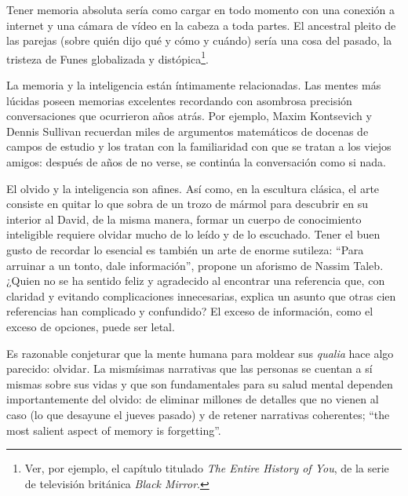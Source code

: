 \documentclass[12pt,a4paper, spanish]{amsart}
\numberwithin{equation}{section}
\theoremstyle{plain}
\theoremstyle{definition}
\begin{document}
Tener memoria absoluta sería como cargar en todo momento con una conexión a internet y una cámara de vídeo en la cabeza a toda partes. El ancestral pleito de las parejas (sobre quién dijo qué y cómo y cuándo) sería una cosa del pasado,  la tristeza de Funes globalizada y distópica\footnote{Ver, por ejemplo, el capítulo titulado \emph{The Entire History of You}, de la serie de televisión británica \emph{Black Mirror}.}. 

La memoria y la inteligencia están íntimamente relacionadas. Las mentes más lúcidas poseen memorias excelentes recordando con asombrosa precisión conversaciones que ocurrieron años atrás. Por ejemplo, Maxim Kontsevich y Dennis Sullivan recuerdan miles de argumentos matemáticos de docenas de campos de estudio y los tratan con la familiaridad con que se tratan a los viejos amigos: después de años de no verse, se continúa la conversación como si nada.

El olvido y la inteligencia son afines. Así como, en la escultura clásica, el arte consiste en quitar lo que sobra de un trozo de mármol para descubrir en su interior al David, de la misma manera, formar un cuerpo de conocimiento inteligible requiere olvidar mucho de lo leído y de lo escuchado. Tener el buen gusto de recordar lo esencial es también un arte de enorme sutileza: ``Para arruinar a un tonto, dale información'', propone un aforismo de Nassim Taleb\autocite{TalebAforismos}. ¿Quien no se ha sentido feliz y agradecido al encontrar una referencia que, con claridad y evitando complicaciones innecesarias, explica un asunto que otras cien referencias han complicado y confundido? El exceso de información, como el exceso de opciones\autocite[1]{zaid2004gondola}, puede ser letal. 



Es razonable conjeturar que la mente humana para moldear sus \emph{qualia} hace algo parecido: olvidar. La mismísimas narrativas que las personas se cuentan a sí mismas sobre sus vidas\autocite{beck2015life} y que son fundamentales para su salud mental dependen importantemente del olvido: de eliminar millones de detalles que no vienen al caso (lo que desayune el jueves pasado) y de retener narrativas coherentes\autocite{mcadams2013psychological}; ``the most salient aspect of memory is forgetting''\autocite{harlow1971psychology}. 
\end{document}
